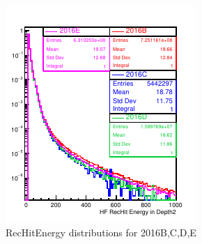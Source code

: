 \begin{figure}[!h]
\begin{minipage}[c]{0.32\linewidth}
\end{minipage}
\begin{minipage}[c]{0.32\linewidth}
\centering
\includegraphics[width=0.99\linewidth]{../Figures/Chap2/ImageFiles_HF/BasicPics/Comp2016/RecHitsES2016BtoE.pdf}
\end{minipage}
\caption{RecHitEnergy distributions for 2016B,C,D,E}
\label{RecHitE2016BtoE}
\end{figure}
